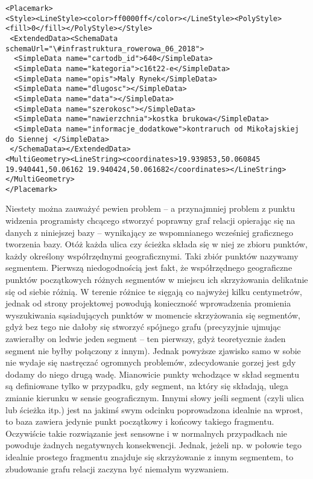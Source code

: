 \lstset{language=XML}
\begin{lstlisting}
<Placemark>
<Style><LineStyle><color>ff0000ff</color></LineStyle><PolyStyle><fill>0</fill></PolyStyle></Style>
 <ExtendedData><SchemaData schemaUrl="\#infrastruktura_rowerowa_06_2018">
  <SimpleData name="cartodb_id">640</SimpleData>
  <SimpleData name="kategoria">c16t22-e</SimpleData>
  <SimpleData name="opis">Maly Rynek</SimpleData>
  <SimpleData name="dlugosc"></SimpleData>
  <SimpleData name="data"></SimpleData>
  <SimpleData name="szerokosc"></SimpleData>
  <SimpleData name="nawierzchnia">kostka brukowa</SimpleData>
  <SimpleData name="informacje_dodatkowe">kontraruch od Mikołajskiej do Siennej </SimpleData>
 </SchemaData></ExtendedData>
<MultiGeometry><LineString><coordinates>19.939853,50.060845 19.940441,50.06162 19.940424,50.061682</coordinates></LineString></MultiGeometry>
</Placemark>
\end{lstlisting}

Niestety można zauważyć pewien problem – a przynajmniej problem z punktu widzenia programisty chcącego stworzyć poprawny graf relacji opierając się na danych z niniejszej bazy – wynikający ze wspomnianego wcześniej graficznego tworzenia bazy. Otóż każda ulica czy ścieżka składa się w niej ze zbioru punktów, każdy określony współrzędnymi geograficznymi. Taki zbiór punktów nazywamy segmentem. Pierwszą niedogodnością jest fakt, że współrzędnego geograficzne punktów początkowych różnych segmentów w miejscu ich skrzyżowania delikatnie się od siebie różnią. W terenie różnice te sięgają co najwyżej kilku centymetrów, jednak od strony projektowej powodują konieczność wprowadzenia promienia wyszukiwania sąsiadujących punktów w momencie skrzyżowania się segmentów, gdyż bez tego nie dałoby się stworzyć spójnego grafu (precyzyjnie ujmując zawierałby on ledwie jeden segment – ten pierwszy, gdyż teoretycznie żaden segment nie byłby połączony z innym). Jednak powyższe zjawisko samo w sobie nie wydaje się nastręczać ogromnych problemów, zdecydowanie gorzej jest gdy dodamy do niego drugą wadę. Mianowicie punkty wchodzące w skład segmentu są definiowane tylko w przypadku, gdy segment, na który się składają, ulega zmianie kierunku w sensie geograficznym. Innymi słowy jeśli segment (czyli ulica lub ścieżka itp.) jest na jakimś swym odcinku poprowadzona idealnie na wprost, to baza zawiera jedynie punkt początkowy i końcowy takiego fragmentu. Oczywiście takie rozwiązanie jest sensowne i w normalnych przypadkach nie powoduje żadnych negatywnych konsekwencji. Jednak, jeżeli np. w połowie tego idealnie prostego fragmentu znajduje się skrzyżowanie z innym segmentem, to zbudowanie grafu relacji zaczyna być niemałym wyzwaniem. 

